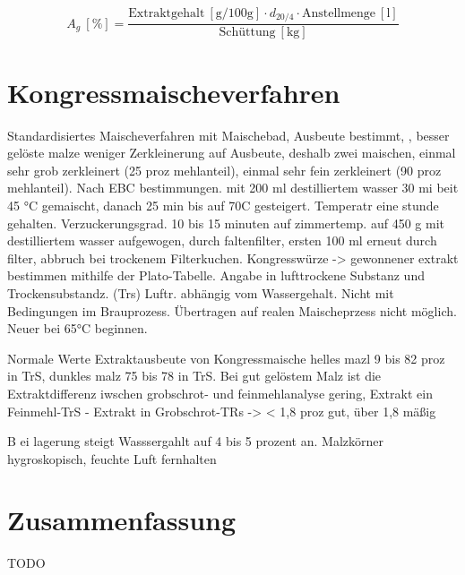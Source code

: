 \documentclass[a4paper,parskip=half]{scrartcl}
\newcommand{\ukg}{\:[\textrm{kg}]}
\newcommand{\uper}{\:[\textrm{\%}]}
\newcommand{\umper}{\:[\textrm{g/100g}]}
\newcommand{\uli}{\:[\text{l}]}
\begin{document}
\begin{equation}
A_g \uper = \frac{\text{Extraktgehalt} \umper \cdot d_{20/4} \cdot \text{Anstellmenge} \uli}{\text{Schüttung} \ukg}
\label{eq:gka}
\end{equation}


\section*{Kongressmaischeverfahren}

Standardisiertes Maischeverfahren mit Maischebad, Ausbeute bestimmt, , besser gelöste malze weniger Zerkleinerung auf Ausbeute,
deshalb zwei maischen, einmal sehr grob zerkleinert (25 proz mehlanteil), einmal sehr fein zerkleinert (90 proz mehlanteil). Nach EBC bestimmungen. mit 200 ml destilliertem wasser 30 mi beit 45 °C gemaischt, danach 25 min bis auf 70C gesteigert. Temperatr eine stunde gehalten. Verzuckerungsgrad. 10 bis 15 minuten auf zimmertemp. auf 450 g mit destilliertem wasser aufgewogen, durch faltenfilter, ersten 100 ml erneut durch filter, abbruch bei trockenem Filterkuchen. Kongresswürze -> gewonnener extrakt bestimmen mithilfe der Plato-Tabelle.
Angabe in lufttrockene Substanz und Trockensubstandz. (Trs) Luftr.  abhängig vom Wassergehalt. Nicht mit Bedingungen im Brauprozess. Übertragen auf realen Maischeprzess nicht möglich. Neuer bei 65°C beginnen.
\parencite[194\psq]{Kunze2016}

Normale Werte Extraktausbeute von Kongressmaische
helles mazl 9 bis 82 proz in TrS, dunkles malz 75 bis 78 in TrS. Bei gut gelöstem Malz ist die Extraktdifferenz iwschen grobschrot- und feinmehlanalyse gering, 
Extrakt ein Feinmehl-TrS - Extrakt in Grobschrot-TRs -> < 1,8 proz gut, über 1,8 mäßig
\parencite[195]{Kunze2016}

B ei lagerung steigt Wasssergahlt auf 4 bis 5 prozent an. \parencite[191]{Kunze2016}
Malzkörner hygroskopisch, feuchte Luft fernhalten

\parencite{Holle2010}
\parencite{Carr2015}

\section*{Zusammenfassung}

TODO

\printbibliography[title=Quellen]
\end{document}
